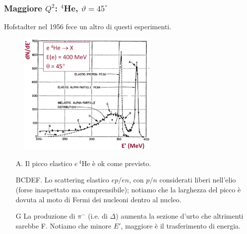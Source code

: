 \subsubsection{Maggiore $Q^2$: $^4$He, $\vartheta=45^\circ$}
Hofstadter nel 1956 fece un altro di questi esperimenti.
\begin{figure}[H]
    \centering
    \includegraphics[width=0.6\textwidth]{immagini/fig_higher_q2_helium.png}
\end{figure}
\begin{itemize}
    \item [A.] Il picco elastico $e\,^4$He è ok come previsto. 
    \item [BCDEF.] Lo scattering elastico $ep/en$, con $p/n$ considerati liberi nell'elio (forse inaspettato ma comprensibile); notiamo che la larghezza del picco è dovuta al moto di Fermi dei nucleoni dentro al nucleo. 
    \item [G] La produzione di $\pi^-$ (i.e. di $\Delta$) aumenta la sezione d'urto che altrimenti sarebbe F. Notiamo che minore $E'$, maggiore è il trasferimento di energia.
\end{itemize}

